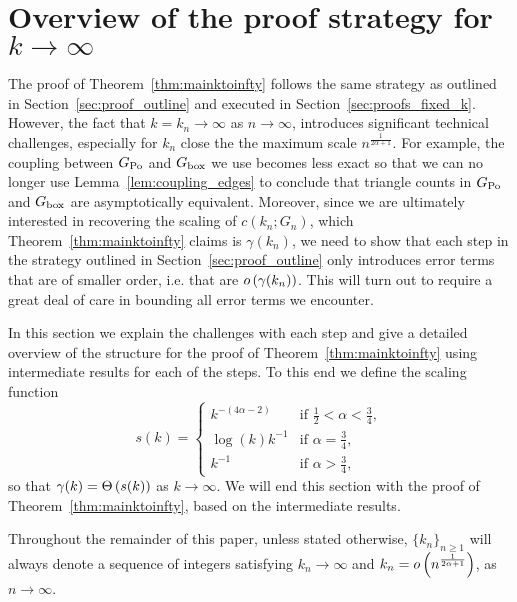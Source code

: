 
\section{Overview of the proof strategy for $k \to \infty$}

The proof of Theorem~\ref{thm:mainktoinfty} follows the same strategy as outlined in Section~\ref{sec:proof_outline} and executed in Section~\ref{sec:proofs_fixed_k}. However, the fact that $k = k_n \to \infty$ as $n \to \infty$, introduces significant technical challenges, especially for $k_n$ close the the maximum scale $n^{\frac{1}{2\alpha + 1}}$. For example, the coupling between $G_{\text{Po}}$ and $G_{\text{box}}$ we use becomes less exact so that we can no longer use Lemma~\ref{lem:coupling_edges} to conclude that triangle counts in $G_{\text{Po}}$ and $G_{\text{box}}$ are asymptotically equivalent. Moreover, since we are ultimately interested in recovering the scaling of $c(k_n;G_n)$, which Theorem~\ref{thm:mainktoinfty} claims is $\gamma(k_n)$, we need to show that each step in the strategy outlined in Section~\ref{sec:proof_outline} only introduces error terms that are of smaller order, i.e. that are $o\left(\gamma(k_n)\right)$. This will turn out to require a great deal of care in bounding all error terms we encounter.

In this section we explain the challenges with each step and give a detailed overview of the structure for the proof of Theorem~\ref{thm:mainktoinfty} using intermediate results for each of the steps. To this end we define the scaling function
\begin{equation}\label{eq:def_scaling_function}
	s(k) = \begin{cases}
		k^{-(4\alpha - 2)} &\mbox{if } \frac{1}{2} < \alpha < \frac{3}{4},\\
		\log(k) k^{-1} &\mbox{if } \alpha = \frac{3}{4},\\
		k^{-1} &\mbox{if } \alpha > \frac{3}{4},
	\end{cases}
\end{equation}
so that $\gamma(k) = \Theta\left(s(k)\right)$ as $k \to \infty$. We will end this section with the proof of Theorem~\ref{thm:mainktoinfty}, based on the intermediate results.

\begin{remark}[Diverging $k_n$]
Throughout the remainder of this paper, unless stated otherwise, $\{k_n\}_{n \ge 1}$ will always denote a sequence of integers satisfying $k_n \to \infty$ and $k_n = o\left(n^{\frac{1}{2\alpha + 1}}\right)$, as $n \to \infty$.
\end{remark}

